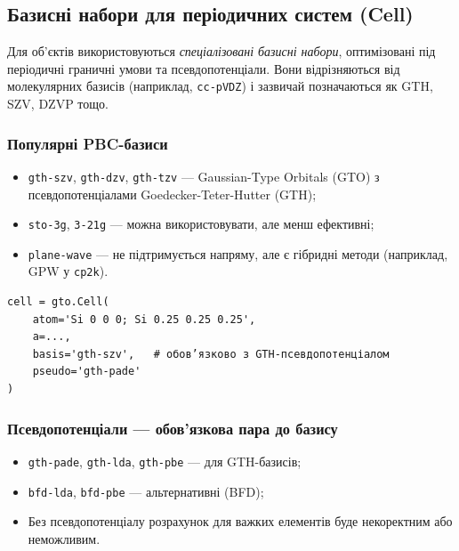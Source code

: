 \subsection{Базисні набори для періодичних систем (Cell)}

Для об’єктів  використовуються \emph{спеціалізовані базисні набори}, оптимізовані під періодичні граничні умови та псевдопотенціали.
Вони відрізняються від молекулярних базисів (наприклад, \texttt{cc-pVDZ}) і зазвичай позначаються як GTH, SZV, DZVP тощо.

\subsubsection{Популярні PBC-базиси}

\begin{itemize}
	\item \texttt{gth-szv}, \texttt{gth-dzv}, \texttt{gth-tzv} --- Gaussian-Type Orbitals (GTO) з псевдопотенціалами Goedecker-Teter-Hutter (GTH);
	\item \texttt{sto-3g}, \texttt{3-21g} --- можна використовувати, але менш ефективні;
	\item \texttt{plane-wave} --- не підтримується напряму, але є гібридні методи (наприклад, GPW у \texttt{cp2k}).
\end{itemize}

\begin{verbatim}
cell = gto.Cell(
    atom='Si 0 0 0; Si 0.25 0.25 0.25',
    a=...,
    basis='gth-szv',   # обов’язково з GTH-псевдопотенціалом
    pseudo='gth-pade'
)
\end{verbatim}

\subsubsection{Псевдопотенціали --- обов’язкова пара до базису}

\begin{itemize}
	\item \texttt{gth-pade}, \texttt{gth-lda}, \texttt{gth-pbe} --- для GTH-базисів;
	\item \texttt{bfd-lda}, \texttt{bfd-pbe} --- альтернативні (BFD);
	\item Без псевдопотенціалу розрахунок для важких елементів буде некоректним або неможливим.
\end{itemize}

